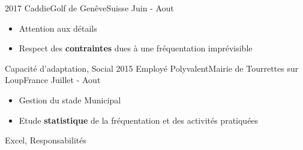 %
%
%
\begin{experiences}
  \experience
    {2017}   {Caddie}{Golf de Genêve}{Suisse}
    {Juin - Aout}{
                      \begin{itemize}
                        \item Attention aux détails
                        \item Respect des \textbf{contraintes} dues à une fréquentation imprévisible
                      \end{itemize}
                    }
                    {Capacité d'adaptation, Social}
                      \experience
    {2015}   {Employé Polyvalent}{Mairie de Tourrettes sur Loup}{France}
    {Juillet - Aout} {
                      \begin{itemize}
                        \item Gestion du stade Municipal                        
                        \item Etude \textbf{statistique} de la fréquentation et des activités pratiquées
                      \end{itemize}
                    }
                    {Excel, Responsabilités} %
  \emptySeparator
\end{experiences}
